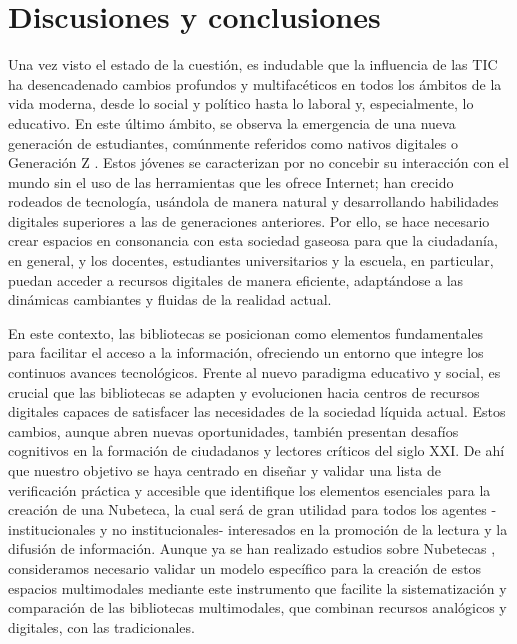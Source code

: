 \documentclass[spanish]{textolivre}
\begin{document}
\section{Discusiones y conclusiones}\label{sec-fmt-manuscrito}
Una vez visto el estado de la cuestión, es indudable que la influencia de las TIC ha desencadenado cambios profundos y multifacéticos en todos los ámbitos de la vida moderna, desde lo social y político hasta lo laboral y, especialmente, lo educativo. En este último ámbito, se observa la emergencia de una nueva generación de estudiantes, comúnmente referidos como nativos digitales \cite{prensky_digital_2001} o Generación Z \cite{alvarez_ramos_generacion_2019}. Estos jóvenes se caracterizan por no concebir su interacción con el mundo sin el uso de las herramientas que les ofrece Internet; han crecido rodeados de tecnología, usándola de manera natural y desarrollando habilidades digitales superiores a las de generaciones anteriores. Por ello, se hace necesario crear espacios en consonancia con esta sociedad gaseosa \cite{scolari_cultura_2021} para que la ciudadanía, en general, y los docentes, estudiantes universitarios y la escuela, en particular, puedan acceder a recursos digitales de manera eficiente, adaptándose a las dinámicas cambiantes y fluidas de la realidad actual.

En este contexto, las bibliotecas se posicionan como elementos fundamentales para facilitar el acceso a la información, ofreciendo un entorno que integre los continuos avances tecnológicos. Frente al nuevo paradigma educativo y social, es crucial que las bibliotecas se adapten y evolucionen hacia centros de recursos digitales capaces de satisfacer las necesidades de la sociedad líquida actual. Estos cambios, aunque abren nuevas oportunidades, también presentan desafíos cognitivos en la formación de ciudadanos y lectores críticos del siglo XXI. De ahí que nuestro objetivo se haya centrado en diseñar y validar una lista de verificación práctica y accesible que identifique los elementos esenciales para la creación de una Nubeteca, la cual será de gran utilidad para todos los agentes -institucionales y no institucionales- \cite{romero_oliva_habitos_2020} interesados en la promoción de la lectura y la difusión de información. Aunque ya se han realizado estudios sobre Nubetecas \cite{valbuena_impacto_2019,cordon-garcia_mpacto_2020}, consideramos necesario validar un modelo específico para la creación de estos espacios multimodales mediante este instrumento que facilite la sistematización y comparación de las bibliotecas multimodales, que combinan recursos analógicos y digitales, con las tradicionales.
\end{document}
